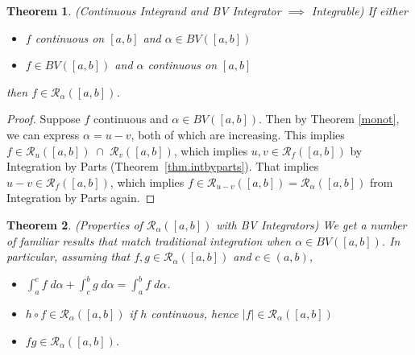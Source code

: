 \documentclass[12pt]{article}
\numberwithin{equation}{section} %
\theoremstyle{plain}
\newtheorem{thm}{Theorem}[section]
\theoremstyle{definition}
\theoremstyle{remark}
\newcommand{\sR}{\mathscr{R}}
\begin{document}
\begin{thm}
\emph{(Continuous Integrand and BV Integrator $\implies$ Integrable)}
If either
\begin{itemize}
  \item $f$ continuous on $[a,b]$ and $\alpha\in BV([a,b])$
  \item $f\in BV([a,b])$ and $\alpha$ continuous on $[a,b]$
\end{itemize}
then $f\in\mathscr{R}_\alpha([a,b])$.
\end{thm}
\begin{proof}
Suppose $f$ continuous and $\alpha\in BV([a,b])$. Then by Theorem
\ref{monot}, we can express $\alpha = u -v$, both of which are
increasing.
This implies $f\in\mathscr{R}_u([a,b]) \;\cap \;\mathscr{R}_v([a,b])$,
which implies $u, v \in \mathscr{R}_f([a,b])$ by Integration by Parts
(Theorem~\ref{thm.intbyparts}). 
That implies $u-v\in\mathscr{R}_f([a,b])$, which implies
$f\in\mathscr{R}_{u-v}([a,b]) = \mathscr{R}_\alpha([a,b])$
from Integration by Parts again.
\end{proof}

\begin{thm}
\emph{(Properties of $\sR_\alpha([a,b])$ with BV Integrators)}
We get a number of familiar results that match traditional integration
when $\alpha\in BV([a,b])$.
In particular, assuming that $f,g\in\mathscr{R}_\alpha([a,b])$
and $c\in(a,b)$,
\begin{itemize}
  \item $\int^c_a f\;d\alpha + \int^b_c g\;d\alpha = \int^b_a f\;d\alpha$.
  \item $h\circ f\in\mathscr{R}_\alpha([a,b])$
    if $h$ continuous,
    hence  $|f|\in\mathscr{R}_\alpha([a,b])$
  \item $fg\in\mathscr{R}_\alpha([a,b])$.
\end{itemize}
\end{thm}
\end{document}

